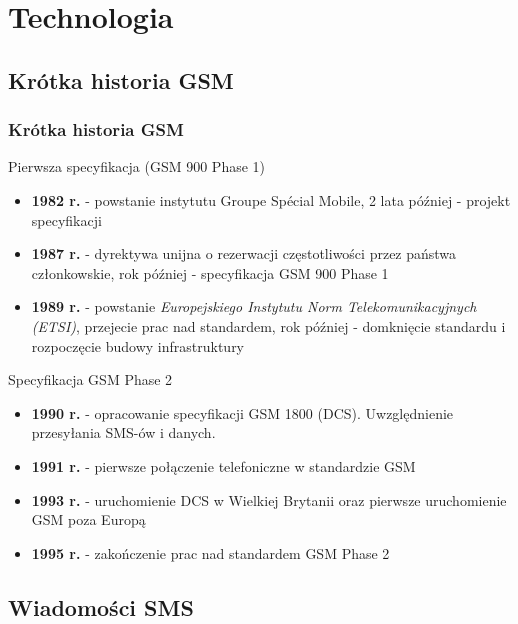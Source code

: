 \documentclass[xcolor=table]{beamer}
\begin{document}
\section{Technologia}

\subsection{Krótka historia GSM}
\begin{frame}[allowframebreaks]
  \frametitle{Krótka historia GSM}

  Pierwsza specyfikacja (GSM 900 Phase 1)
  \begin{itemize}
    \item \textbf{1982 r.} - powstanie instytutu Groupe Spécial Mobile, 2 lata
      później - projekt specyfikacji
    \item \textbf{1987 r.} - dyrektywa unijna o rezerwacji częstotliwości przez
      państwa członkowskie, rok później - specyfikacja GSM 900 Phase 1
    \item \textbf{1989 r.} - powstanie \emph{Europejskiego Instytutu Norm
      Telekomunikacyjnych (ETSI)}, przejecie prac nad standardem, rok później -
      domknięcie standardu i rozpoczęcie budowy infrastruktury
  \end{itemize}

  \framebreak

  Specyfikacja GSM Phase 2
  \begin{itemize}
    \item \textbf{1990 r.} - opracowanie specyfikacji GSM 1800 (DCS).
      Uwzględnienie przesyłania SMS-ów i danych.
    \item \textbf{1991 r.} - pierwsze połączenie telefoniczne w standardzie GSM
    \item \textbf{1993 r.} - uruchomienie DCS w Wielkiej Brytanii oraz pierwsze
      uruchomienie GSM poza Europą
    \item \textbf{1995 r.} - zakończenie prac nad standardem GSM Phase 2
  \end{itemize}
\end{frame}

\subsection{Wiadomości SMS}
\end{document}
